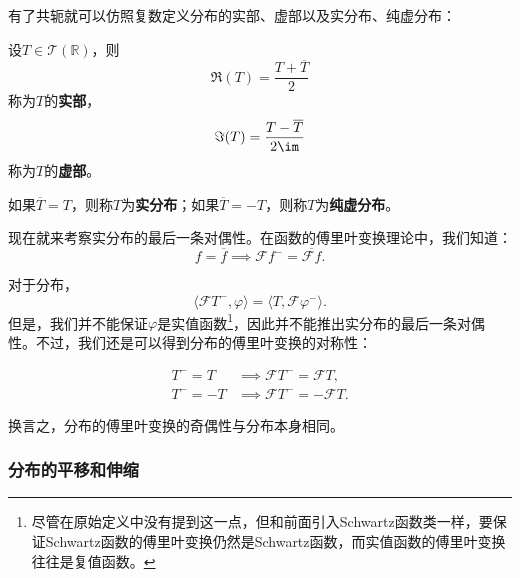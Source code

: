 有了共轭就可以仿照复数定义分布的实部、虚部以及实分布、纯虚分布：
\begin{definition}[分布的实部、虚部]
    设$T\in\mathcal{T}(\mathbb{R})$，则
    \begin{equation}
        \Re(T)=\frac{T+\overline{T}}{2}
    \end{equation}
    称为$T$的\textbf{实部}，
    \begin{equation}
        \Im(T)=\frac{T-\overline{T}}{2\im}
    \end{equation}
    称为$T$的\textbf{虚部}。
\end{definition}
\begin{definition}[实分布与纯虚分布]
    如果$\overline{T}=T$，则称$T$为\textbf{实分布}；如果$\overline{T}=-T$，则称$T$为\textbf{纯虚分布}。
\end{definition}
现在就来考察实分布的最后一条对偶性。在函数的傅里叶变换理论中，我们知道：
\begin{equation}
    f=\overline{f}\implies \mathcal{F}f^- =\overline{\mathcal{F}f}.
\end{equation}

对于分布，
\begin{equation}
    \langle\mathcal{F}T^-,\varphi\rangle =\langle T,\mathcal{F}\varphi^-\rangle.
\end{equation}
但是，我们并不能保证$\varphi$是实值函数\footnote{尽管在原始定义中没有提到这一点，但和前面引入Schwartz函数类一样，要保证Schwartz函数的傅里叶变换仍然是Schwartz函数，而实值函数的傅里叶变换往往是复值函数。}，因此并不能推出实分布的最后一条对偶性。不过，我们还是可以得到分布的傅里叶变换的对称性：
\begin{theorem}[分布的傅里叶变换的对称性]
    \begin{align}
        T^-=T&\implies\mathcal{F}T^-=\mathcal{F}T, \\
        T^-=-T&\implies\mathcal{F}T^-=-\mathcal{F}T.
    \end{align}
\end{theorem}
换言之，分布的傅里叶变换的奇偶性与分布本身相同。

\subsubsection{分布的平移和伸缩}

